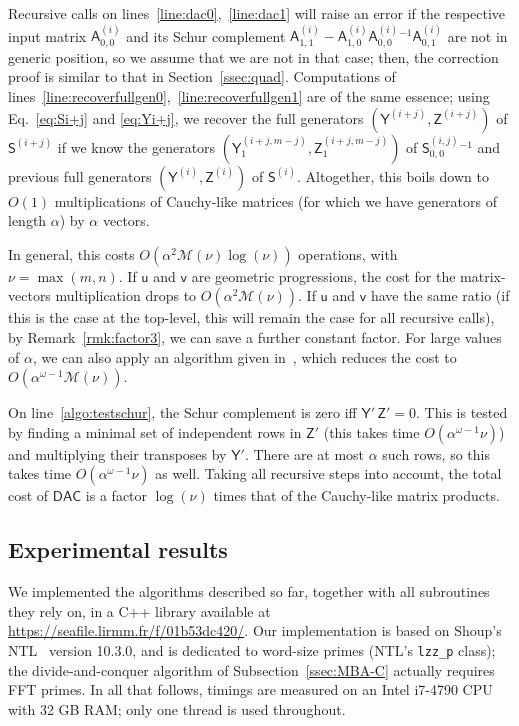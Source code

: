 \documentclass[sigconf]{acmart}
\newcommand{\vu}{\ensuremath{\mathsf{u}}}
\newcommand{\vv}{\ensuremath{\mathsf{v}}}
\newcommand{\mA}{\ensuremath{\mathsf{A}}}
\newcommand{\mS}{\ensuremath{\mathsf{S}}}
\newcommand{\mY}{\ensuremath{\mathsf{Y}}}
\newcommand{\mZ}{\ensuremath{\mathsf{Z}}}
\newcommand{\M}{\ensuremath{\mathscr{M}}}
\newcommand{\mx}{\ensuremath{\nu}}
\newcommand{\DACp}{\ensuremath{\mathsf{DAC}}}
\theoremstyle{acmdefinition}
\begin{document}
Recursive calls on lines~\ref{line:dac0},~\ref{line:dac1}
will raise an error if the respective input matrix
${\mA^{(i)}_{0,0}}$ and its Schur complement $\mA^{(i)}_{1,1} -
\mA^{(i)}_{1,0} {\mA^{(i)}_{0,0}}{}^{-1} \mA^{(i)}_{0,1}$ are not in
generic position, so we assume that we are not in that case; then, the
correction proof is similar to that in Section~\ref{ssec:quad}.
Computations of
lines~\ref{line:recoverfullgen0},~\ref{line:recoverfullgen1} are of
the same essence; using Eq.~\eqref{eq:Si+j} and \eqref{eq:Yi+j}, we
recover the full generators $(\mY^{(i+j)},\mZ^{(i+j)})$ of
$\mS^{(i+j)}$ if we know the generators
$(\mY^{(i+j,m-j)}_1,\mZ^{(i+j,m-j)}_1)$ of $\mS^{(i,j)}_{0,0}{}^{-1}$
and previous full generators $(\mY^{(i)},\mZ^{(i)})$ of $\mS^{(i)}$.
Altogether, this boils down to $O(1)$ multiplications of Cauchy-like
matrices (for which we have generators of length $\alpha$) 
by $\alpha$ vectors.

In general, this costs $O(\alpha^2 \M(\mx) \log(\mx))$
operations, with $\mx=\max(m,n)$. If $\vu$ and $\vv$ are 
geometric progressions, the cost for the matrix-vectors multiplication
drops to $O(\alpha^2 \M(\mx))$. If $\vu$ and $\vv$ have the same ratio
(if this is the case at the top-level, this will remain the case for
all recursive calls),  by Remark~\ref{rmk:factor3}, we can save
a further constant factor.  For large values of $\alpha$, we
can also apply an algorithm given in~\cite{BoJeMoSc16}, which reduces the
cost to $O(\alpha^{\omega-1} \M(\mx))$.

On line~\ref{algo:testschur}, the Schur complement is zero iff
$\mY'\, \mZ' = 0$. This is tested by finding a minimal set of
independent rows in $\mZ'$ (this takes time
$O(\alpha^{\omega-1} \mx)$) and multiplying their transposes by
${\mY'}$. There are at most $\alpha$ such rows, so this takes time
$O(\alpha^{\omega-1} \mx)$ as well.  Taking all recursive steps into
account, the total cost of $\DACp$ is a factor $\log(\mx)$ times that
of the Cauchy-like matrix products.


\vspace{-5px}
\subsection{Experimental results}\label{ssec:exp1}

We implemented the algorithms described so far, together with all
subroutines they rely on, in a C++ library available at
\url{https://seafile.lirmm.fr/f/01b53dc420/}. Our implementation
is based on Shoup's NTL~\cite{Shoup95,NTL} version 10.3.0, and is
dedicated to word-size primes (NTL's \texttt{lzz\_p} class); the
divide-and-conquer algorithm of Subsection~\ref{ssec:MBA-C} actually
requires FFT primes.  In all that follows, timings are measured on an
Intel i7-4790 CPU with 32 GB RAM; only one thread is used throughout.
\end{document}
